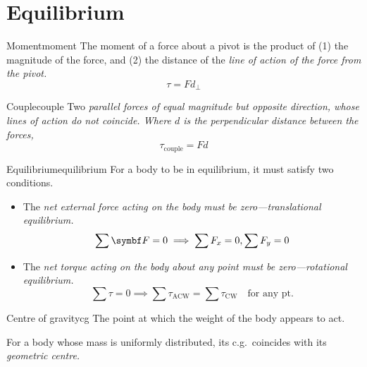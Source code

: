 \chapter{Equilibrium}
\begin{definition}{Moment}{moment}
	The moment of a force about a pivot is the product of (1) the magnitude of the force, and
	(2) the distance of the \it{line of action} of the force from the pivot.
	\[\tau = Fd_\perp\]
\end{definition}
\begin{definition}{Couple}{couple}
	Two \it{parallel} forces of equal magnitude but opposite direction, whose \it{lines of action}
	do not coincide. Where \(d\) is the perpendicular distance between the forces,
	\[\tau_\text{couple} = Fd\]
\end{definition}
\begin{definition}{Equilibrium}{equilibrium}
	For a body to be in equilibrium, it must satisfy two conditions.
	\begin{itemize}
		\item The \it{net external force} acting on the body must be zero---translational equilibrium.
		      \[\sum \va{F} = 0 \implies \sum F_x = 0, \sum F_y = 0\]
		\item The \it{net torque} acting on the body \it{about any point} must be zero---rotational equilibrium.
		      \[\sum \tau = 0 \implies \sum\tau_\text{ACW}=\sum\tau_\text{CW}\quad\text{for any pt.}\]
	\end{itemize}
\end{definition}
\begin{definition}{Centre of gravity}{cg}
	The point at which the weight of the body appears to act.
\end{definition}
For a body whose mass is uniformly distributed, its c.g.~coincides with its \it{geometric centre}.